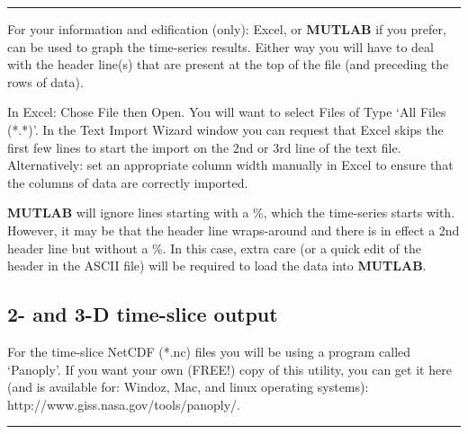 \documentclass[11pt,fleqn]{book} %
\begin{document}
\vspace{1mm}
\noindent\rule{4cm}{0.1mm}
\vspace{2mm}

For your information and edification (only): Excel, or \textbf{MUTLAB} if you prefer, can be used to graph the time-series results. Either way you will have to deal with the header line(s) that are present at the top of the file (and preceding the rows of data).

In Excel: Chose File then Open. You will want to select Files of Type ‘All Files (*.*)’. In the Text Import Wizard window you can request that Excel skips the first few lines to start the import on the 2nd or 3rd line of the text file. Alternatively: set an appropriate column width manually in Excel to ensure that the columns of data are correctly imported.

\textbf{MUTLAB} will ignore lines starting with a \%, which the time-series starts with. However, it may be that the header line wraps-around and there is in effect a 2nd header line but without a \%. In this case, extra care (or a quick edit of the header in the ASCII file) will be required to load the data into \textbf{MUTLAB}.


\subsection{2- and 3-D time-slice output}

For the time-slice NetCDF (*.nc) files you will be using a program called ‘Panoply’. If you want your own (FREE!) copy of this utility, you can get it here (and is available for: Windoz, Mac, and linux operating systems): http://www.giss.nasa.gov/tools/panoply/.

\vspace{1mm}
\noindent\rule{4cm}{0.1mm}
\vspace{2mm}
\end{document}
